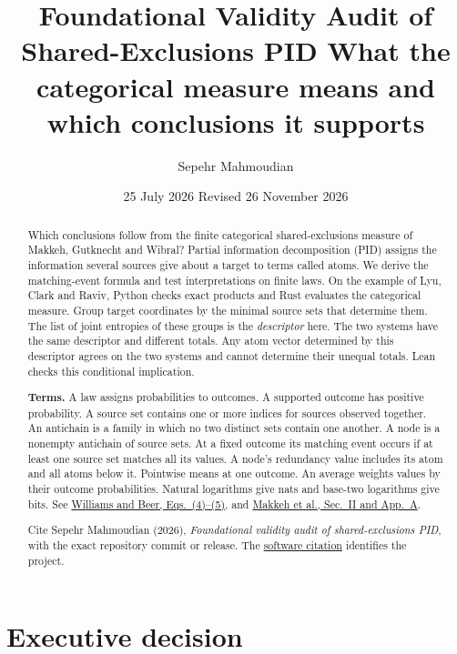\documentclass[11pt]{article}
\title{\PidReportTitle
  {Foundational Validity Audit of Shared-Exclusions PID}
  {What the categorical measure means and which conclusions it supports}}
\author{Sepehr Mahmoudian}
\date{25 July 2026 \quad Revised 26 November 2026}
\begin{document}
\PidMakeTitle

\begin{abstract}
Which conclusions follow from the finite categorical shared-exclusions measure of Makkeh, Gutknecht and Wibral? Partial information decomposition (PID) assigns the information several sources give about a target to terms called atoms. We derive the matching-event formula and test interpretations on finite laws. On the example of Lyu, Clark and Raviv, Python checks exact products and Rust evaluates the categorical measure. Group target coordinates by the minimal source sets that determine them. The list of joint entropies of these groups is the \emph{descriptor} here. The two systems have the same descriptor and different totals. Any atom vector determined by this descriptor agrees on the two systems and cannot determine their unequal totals. Lean checks this conditional implication.

\textbf{Terms.} A law assigns probabilities to outcomes. A supported outcome has positive probability. A source set contains one or more indices for sources observed together. An antichain is a family in which no two distinct sets contain one another. A node is a nonempty antichain of source sets. At a fixed outcome its matching event occurs if at least one source set matches all its values. A node's redundancy value includes its atom and all atoms below it. Pointwise means at one outcome. An average weights values by their outcome probabilities. Natural logarithms give nats and base-two logarithms give bits. See \href{https://arxiv.org/abs/1004.2515v1}{Williams and Beer, Eqs.~(4)--(5)}, and \href{https://arxiv.org/abs/2002.03356v5}{Makkeh et al., Sec.~II and App.~A}.

Cite Sepehr Mahmoudian (2026), \emph{Foundational validity audit of shared-exclusions PID}, with the exact repository commit or release. The \href{https://github.com/sepahead/pid-rs/blob/main/CITATION.cff}{software citation} identifies the project.
\end{abstract}

\tableofcontents

\section{Executive decision}
\end{document}
